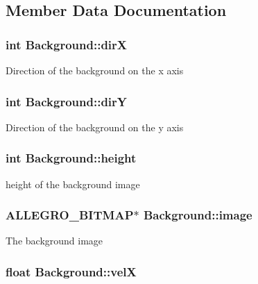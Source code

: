 \subsection{Member Data Documentation}
\hypertarget{structBackground_afee83ed66ba7a564613525287cc33b32}{
\subsubsection[{dirX}]{\setlength{\rightskip}{0pt plus 5cm}int {\bf Background::dirX}}}
\label{structBackground_afee83ed66ba7a564613525287cc33b32}
Direction of the background on the x axis \hypertarget{structBackground_ae85e5871207ab04a678f217b3baf72fc}{
\subsubsection[{dirY}]{\setlength{\rightskip}{0pt plus 5cm}int {\bf Background::dirY}}}
\label{structBackground_ae85e5871207ab04a678f217b3baf72fc}
Direction of the background on the y axis \hypertarget{structBackground_ab309ccac36fbe6b88cab0e30e8da1452}{
\subsubsection[{height}]{\setlength{\rightskip}{0pt plus 5cm}int {\bf Background::height}}}
\label{structBackground_ab309ccac36fbe6b88cab0e30e8da1452}
height of the background image \hypertarget{structBackground_aca1e48275f069718251c7023ddb5c9bb}{
\subsubsection[{image}]{\setlength{\rightskip}{0pt plus 5cm}ALLEGRO\_\-BITMAP$\ast$ {\bf Background::image}}}
\label{structBackground_aca1e48275f069718251c7023ddb5c9bb}
The background image \hypertarget{structBackground_a3baf341baf83315a91f694bafebf3a0e}{
\subsubsection[{velX}]{\setlength{\rightskip}{0pt plus 5cm}float {\bf Background::velX}}}
